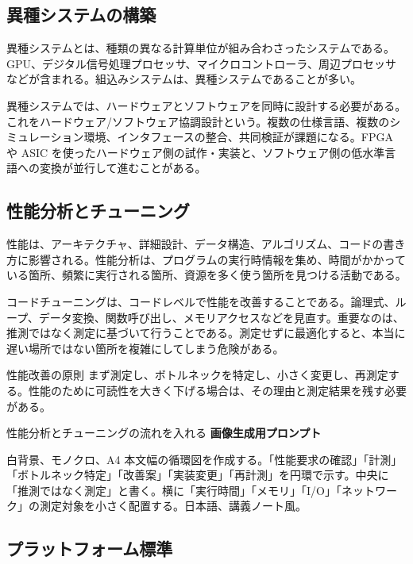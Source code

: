 \documentclass[a4paper,11pt,ja=standard,xelatex]{bxjsarticle}
\begin{document}
\subsection{異種システムの構築}

異種システムとは、種類の異なる計算単位が組み合わさったシステムである。GPU、デジタル信号処理プロセッサ、マイクロコントローラ、周辺プロセッサなどが含まれる。組込みシステムは、異種システムであることが多い。

異種システムでは、ハードウェアとソフトウェアを同時に設計する必要がある。これをハードウェア/ソフトウェア協調設計という。複数の仕様言語、複数のシミュレーション環境、インタフェースの整合、共同検証が課題になる。FPGA や ASIC を使ったハードウェア側の試作・実装と、ソフトウェア側の低水準言語への変換が並行して進むことがある。

\subsection{性能分析とチューニング}

性能は、アーキテクチャ、詳細設計、データ構造、アルゴリズム、コードの書き方に影響される。性能分析は、プログラムの実行時情報を集め、時間がかかっている箇所、頻繁に実行される箇所、資源を多く使う箇所を見つける活動である。

コードチューニングは、コードレベルで性能を改善することである。論理式、ループ、データ変換、関数呼び出し、メモリアクセスなどを見直す。重要なのは、推測ではなく測定に基づいて行うことである。測定せずに最適化すると、本当に遅い場所ではない箇所を複雑にしてしまう危険がある。

\begin{keybox}{性能改善の原則}
まず測定し、ボトルネックを特定し、小さく変更し、再測定する。性能のために可読性を大きく下げる場合は、その理由と測定結果を残す必要がある。
\end{keybox}

\begin{todobox}{性能分析とチューニングの流れを入れる}
\textbf{画像生成用プロンプト}

白背景、モノクロ、A4 本文幅の循環図を作成する。「性能要求の確認」「計測」「ボトルネック特定」「改善案」「実装変更」「再計測」を円環で示す。中央に「推測ではなく測定」と書く。横に「実行時間」「メモリ」「I/O」「ネットワーク」の測定対象を小さく配置する。日本語、講義ノート風。
\end{todobox}

\subsection{プラットフォーム標準}
\end{document}
